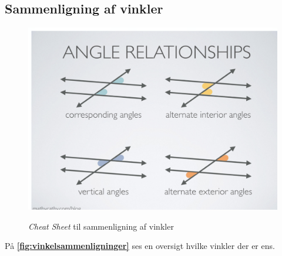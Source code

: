 \clearpage

\subsection{Sammenligning af vinkler}
\begin{figure} [ht]
  \centering
  \caption{\textit{Cheat Sheet} til sammenligning af vinkler}
  \includegraphics[width=0.5\linewidth]{../figures/vinkelsammenligninger.png}
  \label{fig:vinkelsammenligninger}
\end{figure}

På \textbf{\autoref{fig:vinkelsammenligninger}} ses en oversigt hvilke vinkler der er ens.


\newpage

